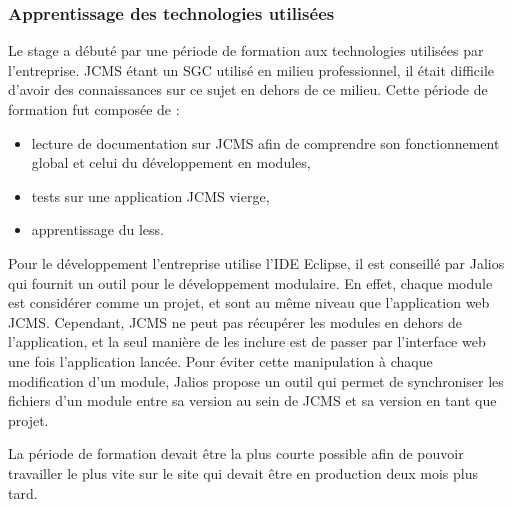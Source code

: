 \documentclass[12pt,a4paper]{article}
\begin{document}
\subsubsection{Apprentissage des technologies utilisées}
Le stage a débuté par une période de formation aux technologies utilisées par l'entreprise. \gls{JCMS} étant un SGC utilisé en milieu professionnel, il était difficile d'avoir des connaissances sur ce sujet en dehors de ce milieu. Cette période de formation fut composée de :
\begin{itemize}
\item lecture de documentation sur \gls{JCMS} afin de comprendre son fonctionnement global et celui du développement en modules,
\item tests sur une application \gls{JCMS} vierge,
\item apprentissage du less.
\end{itemize}\par 
Pour le développement l'entreprise utilise l'IDE Eclipse, il est conseillé par Jalios qui fournit un outil pour le développement modulaire. En effet, chaque module est considérer comme un projet, et sont au même niveau que l'application web \gls{JCMS}. Cependant, \gls{JCMS} ne peut pas récupérer les modules en dehors de l'application, et la seul manière de les inclure est de passer par l'interface web une fois l'application lancée. Pour éviter cette manipulation à chaque modification d'un module, Jalios propose un outil qui permet de synchroniser les fichiers d'un module entre sa version au sein de \gls{JCMS} et sa version en tant que projet.\par
La période de formation devait être la plus courte possible afin de pouvoir travailler le plus vite sur le site qui devait être en production deux mois plus tard. \par
\end{document}
